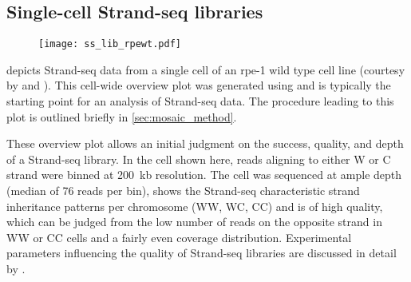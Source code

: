 \subsection{Single-cell Strand-seq libraries}

    \begin{figure}[t!]                                             %
        \captionsetup{type=figure}
        \texttt{[image: ss\_lib\_rpewt.pdf]}
    \end{figure}

 depicts Strand-seq data from a single cell of an \acf{rpe}-1
wild type cell line (courtesy by \balca and \landsdorp). This cell-wide overview
plot was generated using \mc and is typically the starting point for
an analysis of Strand-seq data. The procedure leading to this plot is outlined
briefly in \cref{sec:mosaic_method}.

These overview plot allows an initial judgment on the success, quality, and depth
of a Strand-seq library. In the cell shown here, reads aligning to either W or C
strand were binned at 200~kb resolution. The cell was sequenced at ample depth
(median of 76 reads per bin), shows the Strand-seq characteristic strand
inheritance patterns per chromosome (WW, WC, CC) and is of high quality, which
can be judged from the low number of reads on the opposite strand in WW or CC
cells and a fairly even coverage distribution. Experimental parameters
influencing the quality of Strand-seq libraries are discussed in detail by
\citet{Sanders2017}.

